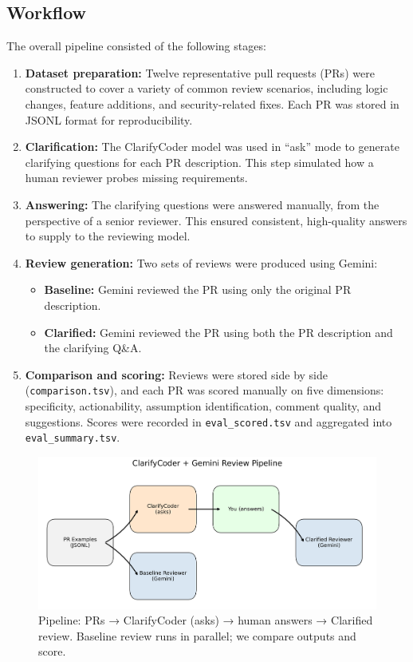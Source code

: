 \documentclass[conference]{IEEEtran}
\begin{document}
\subsection{Workflow}
The overall pipeline consisted of the following stages:
\begin{enumerate}[leftmargin=*]
    \item \textbf{Dataset preparation:} Twelve representative pull requests (PRs) were constructed to cover a variety of common review scenarios, including logic changes, feature additions, and security-related fixes. Each PR was stored in JSONL format for reproducibility.
    \item \textbf{Clarification:} The ClarifyCoder model \cite{wu2025clarifycoder} was used in “ask” mode to generate clarifying questions for each PR description. This step simulated how a human reviewer probes missing requirements.
    \item \textbf{Answering:} The clarifying questions were answered manually, from the perspective of a senior reviewer. This ensured consistent, high-quality answers to supply to the reviewing model.
    \item \textbf{Review generation:} Two sets of reviews were produced using Gemini:
    \begin{itemize}[leftmargin=*]
        \item \textbf{Baseline:} Gemini reviewed the PR using only the original PR description.
        \item \textbf{Clarified:} Gemini reviewed the PR using both the PR description and the clarifying Q\&A.
    \end{itemize}
    \item \textbf{Comparison and scoring:} Reviews were stored side by side (\texttt{comparison.tsv}), and each PR was scored manually on five dimensions: specificity, actionability, assumption identification, comment quality, and suggestions. Scores were recorded in \texttt{eval\_scored.tsv} and aggregated into \texttt{eval\_summary.tsv}.
\end{enumerate}

\begin{figure}[t]
  \centering
  \includegraphics[width=\linewidth]{../results/plots/fig_architecture.png}
  \caption{Pipeline: PRs → ClarifyCoder (asks) → human answers → Clarified review.
  Baseline review runs in parallel; we compare outputs and score.}
  \label{fig:arch}
\end{figure}
\end{document}
